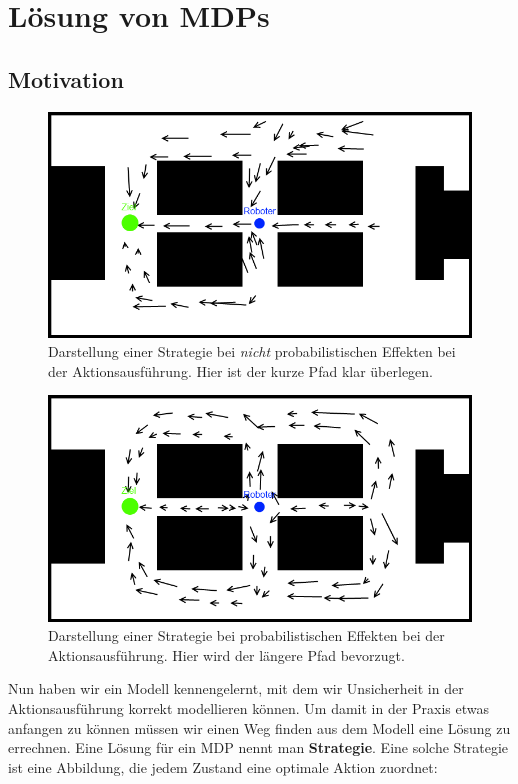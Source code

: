 \documentclass[a4paper]{IEEEtran}
\begin{document}
\section{Lösung von MDPs}
\subsection{Motivation}
\begin{figure}[ht]
	\centering
	\includegraphics[scale=0.42]{images/autnmRobot_detActionMDP.png}
	\caption{Darstellung einer Strategie bei \emph{nicht} probabilistischen Effekten bei der Aktionsausführung. Hier ist der kurze Pfad klar überlegen.}
	\label{holoch_autnmRobot_detA}
\end{figure}
\begin{figure}[ht]
	\centering
	\includegraphics[scale=0.42]{images/autnmRobot_ndetActionMDP.png}
	\caption{Darstellung einer Strategie bei probabilistischen Effekten bei der Aktionsausführung. Hier wird der längere Pfad bevorzugt.}
	\label{holoch_autnmRobot_ndetA}
\end{figure}
Nun haben wir ein Modell kennengelernt, mit dem wir Unsicherheit in der Aktionsausführung korrekt modellieren können. Um damit in der Praxis etwas anfangen zu können müssen wir einen Weg finden aus dem Modell eine Lösung zu errechnen. Eine Lösung für ein MDP nennt man \textbf{Strategie}. Eine solche Strategie ist eine Abbildung, die jedem Zustand eine optimale Aktion zuordnet:
\end{document}
